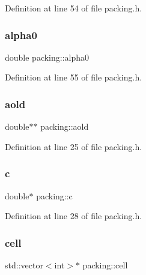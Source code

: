 Definition at line 54 of file packing.\+h.

\mbox{\label{classpacking_afa09f18e29cec06705f33a5253f1b016}} 
\subsubsection{\texorpdfstring{alpha0}{alpha0}}
{\footnotesize\ttfamily double packing\+::alpha0\hspace{0.3cm}{\ttfamily [protected]}}



Definition at line 55 of file packing.\+h.

\mbox{\label{classpacking_a16ab3555506f30e4848ca52ae1136444}} 
\subsubsection{\texorpdfstring{aold}{aold}}
{\footnotesize\ttfamily double$\ast$$\ast$ packing\+::aold\hspace{0.3cm}{\ttfamily [protected]}}



Definition at line 25 of file packing.\+h.

\mbox{\label{classpacking_a01db0c365f0f66bbc2de30fed7e1881a}} 
\subsubsection{\texorpdfstring{c}{c}}
{\footnotesize\ttfamily double$\ast$ packing\+::c\hspace{0.3cm}{\ttfamily [protected]}}



Definition at line 28 of file packing.\+h.

\mbox{\label{classpacking_a5c104fd62aea53bee075d978dd6d9d6a}} 
\subsubsection{\texorpdfstring{cell}{cell}}
{\footnotesize\ttfamily std\+::vector$<$int$>$$\ast$ packing\+::cell\hspace{0.3cm}{\ttfamily [protected]}}



